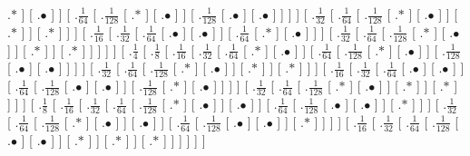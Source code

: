 \documentclass[a4paper,10pt]{article}
\begin{document}
\begin{landscape}
{.$*$ ]  [ .$\bullet$ ]  ]  [ .$\frac{1}{64}$  [ .$\frac{1}{128}$  [ .$*$ ]  [ .$\bullet$ ]  ]  [ .$\frac{1}{128}$  [ .$\bullet$ ]  [ .$\bullet$ ]  ]  ]  ]  [ .$\frac{1}{32}$  [ .$\frac{1}{64}$  [ .$\frac{1}{128}$  [ .$*$ ]  [ .$\bullet$ ]  ]  [ .$*$ ]  ]  [ .$*$ ]  ]  ]  [ .$\frac{1}{16}$  [ .$\frac{1}{32}$  [ .$\frac{1}{64}$  [ .$\bullet$ ]  [ .$\bullet$ ]  ]  [ .$\frac{1}{64}$  [ .$*$ ]  [ .$\bullet$ ]  ]  ]  [ .$\frac{1}{32}$  [ .$\frac{1}{64}$  [ .$\frac{1}{128}$  [ .$*$ ]  [ .$\bullet$ ]  ]  [ .$*$ ]  ]  [ .$*$ ]  ]  ]  ]  ]  [ .$\frac{1}{4}$  [ .$\frac{1}{8}$  [ .$\frac{1}{16}$  [ .$\frac{1}{32}$  [ .$\frac{1}{64}$  [ .$*$ ]  [ .$\bullet$ ]  ]  [ .$\frac{1}{64}$  [ .$\frac{1}{128}$  [ .$*$ ]  [ .$\bullet$ ]  ]  [ .$\frac{1}{128}$  [ .$\bullet$ ]  [ .$\bullet$ ]  ]  ]  ]  [ .$\frac{1}{32}$  [ .$\frac{1}{64}$  [ .$\frac{1}{128}$  [ .$*$ ]  [ .$\bullet$ ]  ]  [ .$*$ ]  ]  [ .$*$ ]  ]  ]  [ .$\frac{1}{16}$  [ .$\frac{1}{32}$  [ .$\frac{1}{64}$  [ .$\bullet$ ]  [ .$\bullet$ ]  ]  [ .$\frac{1}{64}$  [ .$\frac{1}{128}$  [ .$\bullet$ ]  [ .$\bullet$ ]  ]  [ .$\frac{1}{128}$  [ .$*$ ]  [ .$\bullet$ ]  ]  ]  ]  [ .$\frac{1}{32}$  [ .$\frac{1}{64}$  [ .$\frac{1}{128}$  [ .$*$ ]  [ .$\bullet$ ]  ]  [ .$*$ ]  ]  [ .$*$ ]  ]  ]  ]  [ .$\frac{1}{8}$  [ .$\frac{1}{16}$  [ .$\frac{1}{32}$  [ .$\frac{1}{64}$  [ .$\frac{1}{128}$  [ .$*$ ]  [ .$\bullet$ ]  ]  [ .$\bullet$ ]  ]  [ .$\frac{1}{64}$  [ .$\frac{1}{128}$  [ .$\bullet$ ]  [ .$\bullet$ ]  ]  [ .$*$ ]  ]  ]  [ .$\frac{1}{32}$  [ .$\frac{1}{64}$  [ .$\frac{1}{128}$  [ .$*$ ]  [ .$\bullet$ ]  ]  [ .$\bullet$ ]  ]  [ .$\frac{1}{64}$  [ .$\frac{1}{128}$  [ .$\bullet$ ]  [ .$\bullet$ ]  ]  [ .$*$ ]  ]  ]  ]  [ .$\frac{1}{16}$  [ .$\frac{1}{32}$  [ .$\frac{1}{64}$  [ .$\frac{1}{128}$  [ .$\bullet$ ]  [ .$\bullet$ ]  ]  [ .$*$ ]  ]  [ .$*$ ]  ]  [ .$*$ ]  ]  ]  ]  ]  ] 
}

\end{landscape}
\end{document}
